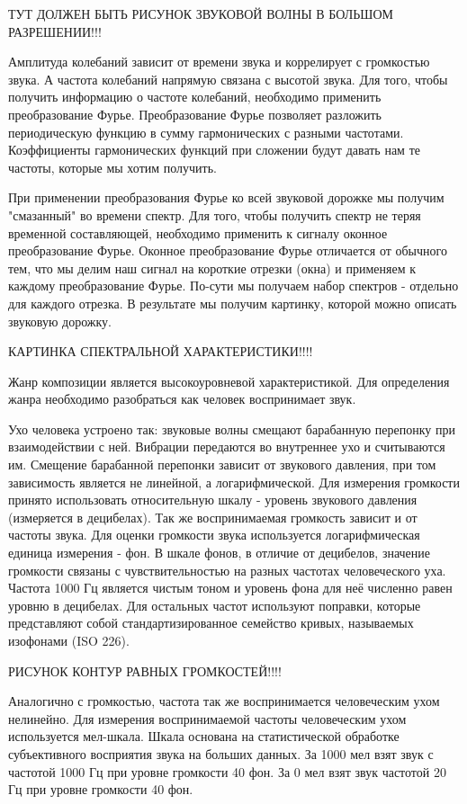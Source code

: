 ТУТ ДОЛЖЕН БЫТЬ РИСУНОК ЗВУКОВОЙ ВОЛНЫ В БОЛЬШОМ РАЗРЕШЕНИИ!!!

Амплитуда колебаний зависит от времени звука и коррелирует с громкостью звука. А частота колебаний напрямую связана с высотой звука. Для того, чтобы получить информацию о частоте колебаний, необходимо применить преобразование Фурье. Преобразование Фурье позволяет разложить периодическую функцию в сумму гармонических с разными частотами. Коэффициенты гармонических функций при сложении будут давать нам те частоты, которые мы хотим получить.

При применении преобразования Фурье ко всей звуковой дорожке мы получим "смазанный" во времени спектр. Для того, чтобы получить спектр не теряя временной составляющей, необходимо применить к сигналу оконное преобразование Фурье. Оконное преобразование Фурье отличается от обычного тем, что мы делим наш сигнал на короткие отрезки (окна) и применяем к каждому преобразование Фурье. По-сути мы получаем набор спектров - отдельно для каждого отрезка. В результате мы получим картинку, которой можно описать звуковую дорожку.

КАРТИНКА СПЕКТРАЛЬНОЙ ХАРАКТЕРИСТИКИ!!!!

Жанр композиции является высокоуровневой характеристикой. Для определения жанра необходимо разобраться как человек воспринимает звук.

Ухо человека устроено так: звуковые волны смещают барабанную перепонку при взаимодействии с ней. Вибрации передаются во внутреннее ухо и считываются им. Смещение барабанной перепонки зависит от звукового давления, при том зависимость является не линейной, а логарифмической. Для измерения громкости принято использовать относительную шкалу - уровень звукового давления (измеряется в децибелах). Так же воспринимаемая громкость зависит и от частоты звука. Для оценки громкости звука используется логарифмическая единица измерения - фон. В шкале фонов, в отличие от децибелов, значение громкости связаны с чувствительностью на разных частотах человеческого уха. Частота 1000 Гц является чистым тоном и уровень фона для неё численно равен уровню в децибелах. Для остальных частот используют поправки, которые представляют собой стандартизированное семейство кривых, называемых изофонами (ISO 226).

РИСУНОК КОНТУР РАВНЫХ ГРОМКОСТЕЙ!!!!

Аналогично с громкостью, частота так же воспринимается человеческим ухом нелинейно. Для измерения воспринимаемой частоты человеческим ухом используется мел-шкала. Шкала основана на статистической обработке субъективного восприятия звука на больших данных. За 1000 мел взят звук с частотой 1000 Гц при уровне громкости 40 фон. За 0 мел взят звук частотой 20 Гц при уровне громкости 40 фон.

